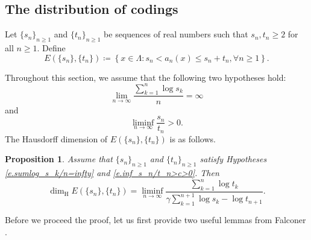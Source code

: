 \documentclass[12pt,reqno]{amsart}
\renewcommand{\=}{\coloneqq}
\theoremstyle{plain}
\newtheorem{proposition}[theorem]{Proposition}
\begin{document}
\subsection{The distribution of codings}

Let $\{s_n\}_{n\geq 1}$ and $\{t_n\}_{n\geq 1}$ be sequences of real numbers such that $s_n, t_n\geq 2$ for all $n\geq 1$.
Define
\begin{equation}\label{e.def_E_s_n_t_n}
E(\{s_n\},\{t_n\})  \coloneqq
        \left\{x\in  \Lambda:s_n<a_n(x)\leq s_n+t_n,
        \forall n\geq 1\right\}.
\end{equation}




Throughout this section, we assume that the following two hypotheses hold:
\begin{equation}\label{e.sumlog_s_k/n=infty}
        \lim_{n\to \infty}
        \frac{\sum_{k=1}^n\log s_k}
        {n}=\infty
\end{equation}
and
\begin{equation}\label{e.inf_s_n/t_n>c>0}
        \liminf_{n\to \infty}\frac{s_n}{t_n}>0.
\end{equation}
The Hausdorff dimension of $E(\{s_n\},\{t_n\})$ is as follows.



\begin{proposition}\label{p.Hausdorff_dimension_E_s_n_t_n}
        Assume that $\{s_n\}_{n\geq 1}$ and $\{t_n\}_{n \geq 1}$ satisfy Hypotheses \eqref{e.sumlog_s_k/n=infty} and \eqref{e.inf_s_n/t_n>c>0}. Then
        \begin{equation}\label{e.Prop_dimension}
                \dim_{\mathrm{H}}
                E (\{s_n\},\{t_n\})
                =\liminf _{n\to \infty}
                \frac{\sum_{k=1}^n\log t_k}
                {\gamma\sum_{k=1}^{n+1}\log s_k-\log t_{n+1}}.
        \end{equation}
\end{proposition}


Before we proceed the proof, let us first provide two useful lemmas from Falconer \cite{Fal}.
\end{document}
